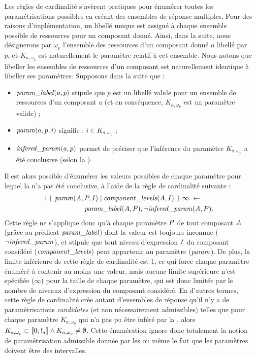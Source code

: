 Les règles de cardinalité s'avèrent pratiques pour énumérer toutes les paramétrisations
possibles en créant des ensembles de réponse multiples.
Pour des raisons d'implémentation, un libellé unique est assigné à chaque ensemble possible
de ressources pour un composant donné.
Ainsi, dans la suite, nous désignerons par $\omega_p$ l'ensemble des ressources
d'un composant donné $a$ libellé par $p$,
et $K_{a,\omega_p}$ est naturellement le paramètre relatif à cet ensemble.
Nous notons que libeller les ensembles de ressources d'un composant
est naturellement identique à libeller ses paramètres.
Supposons dans la suite que :
\begin{itemize}
  \item $\mathit{param\_label}(a, p)$ stipule que $p$ est un libellé valide pour un ensemble de ressources
    d'un composant $a$ (et en conséquence, $K_{a,\omega_p}$ est un paramètre valide) ;
  \item $\mathit{param}(a, p, i)$ signifie : $i \in K_{a, \omega_p}$ ;
  \item $\mathit{infered\_param}(a, p)$ permet de préciser que l'inférence du paramètre $K_{a, \omega_p}$
    a été conclusive (selon la ).
\end{itemize}
Il est alors possible d'énumérer les valeurs possibles de chaque paramètre pour lequel
la  n'a pas été conclusive, à l'aide de la règle de cardinalité
suivante :
\begin{align*}
  & 1\ \{\ \mathit{param}(A, P, I) \mid \mathit{component\_levels}(A,
  I)\ \}\ \infty\ \leftarrow \\
  & \qquad\qquad\qquad \mathit{param\_label}(A, P), \neg \mathit{infered\_param}(A, P).
\end{align*}
Cette règle ne s'applique donc qu'à chaque paramètre $P$ de tout composant $A$
(grâce au prédicat $\mathit{param\_label}$) dont la valeur est toujours inconnue ($\neg \mathit{infered\_param}$),
et stipule que tout niveau d'expression $I$ du composant considéré ($\mathit{component\_levels}$)
peut appartenir au paramètre ($\mathit{param}$).
De plus, la limite inférieure de cette règle de cardinalité est $1$, ce qui force chaque
paramètre énuméré à contenir au moins une valeur,
mais aucune limite supérieure n'est spécifiée ($\infty$) pour la taille de chaque paramètre,
qui est donc limitée par le nombre de niveaux d'expression du composant considéré.
En d'autres termes, cette règle de cardinalité crée autant d'ensembles de réponse qu'il n'y
a de paramétrisations \emph{candidates} (et non nécessairement admissibles)
telles que pour chaque paramètre $K_{a, \omega_p}$ qui n'a pas pu être inféré par
la ,
alors $K_{a, \omega_p} \subset \mathopen{\llbracket}0\mathclose{};l_a\mathclose{\rrbracket} \wedge K_{a, \omega_p} \neq \emptyset$.
Cette énumération ignore donc totalement la notion de paramétrisation admissible
donnée par les \enumparamcr
ou même le fait que les paramètres doivent être des intervalles.



